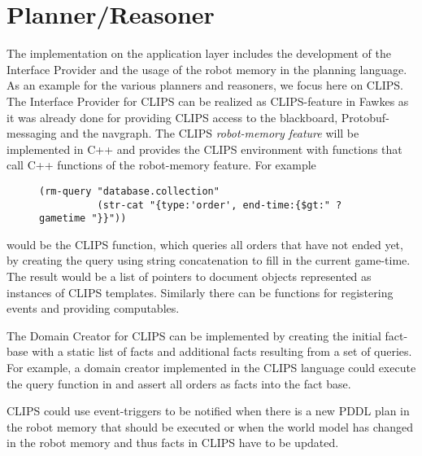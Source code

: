 \section{Planner/Reasoner}
\label{sec:impl-planner}
The implementation on the application layer includes the development
of the Interface Provider and the usage of the robot memory in the
planning language. As an example for the various planners and
reasoners, we focus here on CLIPS. The Interface Provider for CLIPS
can be realized as CLIPS-feature in Fawkes as it was already done for
providing CLIPS access to the blackboard, Protobuf-messaging and the
navgraph. The CLIPS \emph{robot-memory feature} will be implemented in C++
and provides the CLIPS environment with functions that call C++
functions of the robot-memory feature. For example 
\begin{figure}
  \begin{lstlisting}[showlines,style=ReallySmallCLIPS, caption={CLIPS function to execute a query},
  label=lst:clips-rm,
  emph={skill, args, state, target, res},
  emphstyle=\bfseries\color{green!80!black},
  emph={[2]\?skill, \$\?args, wait-for-lock, \?target, use,
  WAIT-FOR-LOCK, SKILL-EXECUTION, running},
  emphstyle={[2]\bfseries\color{blue!80!black}},
  morekeywords={retract, assert, modify, skill-call, skill-to-execute,
    wait-for-lock}]
(rm-query "database.collection"
          (str-cat "{type:'order', end-time:{$gt:" ?gametime "}}"))
\end{lstlisting} %
\end{figure}
would be the CLIPS function, which queries all orders that have not
ended yet, by creating the query using string concatenation to fill in
the current game-time. The result would be a list of pointers to document
objects represented as instances of CLIPS templates. Similarly there
can be functions for registering events and providing computables.

The Domain Creator for CLIPS can be implemented by creating the initial
fact-base with a static list of facts and additional facts resulting
from a set of queries. For example, a domain creator implemented in
the CLIPS language could execute the query function in
 and assert all orders as facts into the fact
base.

CLIPS could use event-triggers to be notified when there is a new PDDL
plan in the robot memory that should be executed or when the world
model has changed in the robot memory and thus facts in CLIPS have to
be updated.

